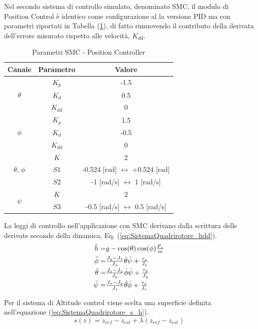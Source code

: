 Nel secondo sistema di controllo simulato, denominato SMC, il modulo di Position Control è identico come configurazione al la versione PID ma con parametri riportati in Tabella (\ref{tab:SMCPOS}), di fatto rimuovendo il contributo della derivata dell'errore misurato rispetto alle velocità, $K_{dd}$.

\begin{table}
	\centering
	\caption{Parametri SMC - Position Controller}
	\begin{tabular}{c c c}
		\hline
		Canale & Parametro & Valore \\
		\hline
		\multirow{3}{*}{$\theta$}&$K_p$ & -1.5 \\
		&$K_d$ & 0.5\\
		&$K_{dd}$ & 0\\
		\hline
		\multirow{3}{*}{$\phi$}& $K_p$ & 1.5 \\
		&$K_d$ & -0.5\\
		&$K_{dd}$ & 0\\
		\hline
		\multirow{3}{*}{$\theta$, $\phi$}&$K$ & 2 \\ 
		&$S1$ & -0.524 [rad] $\leftrightarrow$ +0.524 [rad]\\
		&$S2$ & -1 [rad/s] $\leftrightarrow$ 1  [rad/s]\\
		\hline
		\multirow{2}{*}{$\psi$}&$K$ & 2 \\
		&$S3$ & -0.5 [rad/s] $\leftrightarrow$ 0.5 [rad/s]\\
		\hline		
	\end{tabular}	
	\label{tab:SMCPOS}
\end{table}

La leggi di controllo nell'applicazione con SMC derivano dalla scrittura delle derivate seconde della dinamica, Eq. (\ref{eq:SistemaQuadrirotore_hdd}).
\begin{equation}\label{eq:SistemaQuadrirotore_hdd}
\begin{array}{r@{}l}
	\ddot{h} = & g -\cos(\theta)\cos(\phi)\frac{F_z}{m} \\[1ex]
	\ddot{\phi} = &\frac{J_y -J_z}{J_x} \dot{\theta} \dot{\psi} + \frac{\tau_x}{J_x} \\[1ex]
	\ddot{\theta}  = & \frac{J_z -J_x}{J_y} \dot{\phi} \dot{\psi} + \frac{\tau_y}{J_y} \\[1ex]
	\ddot{\psi}  = & \frac{J_x -J_y}{J_z} \dot{\theta} \dot{\phi} + \frac{\tau_z}{J_z} 
\end{array}
\end{equation}

Per il sistema di Altitude control viene scelta una superficie definita nell'equazione (\ref{eq:SistemaQuadrirotore_s_h}).
\begin{equation}\label{eq:SistemaQuadrirotore_s_h}
	s(z) = \dot{z}_{ref} - \dot{z}_{est} + \lambda (z_{ref} - z_{est})
\end{equation}


